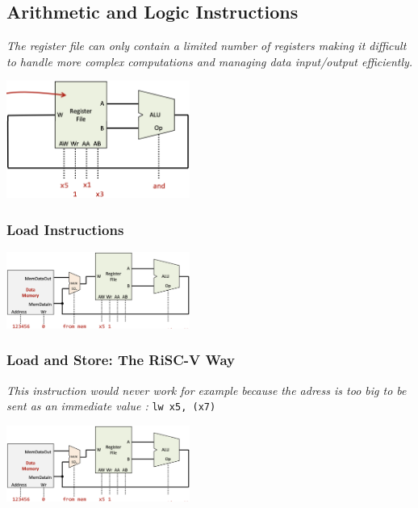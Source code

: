 \subsection{Arithmetic and Logic Instructions}
\textit{The register file can only contain a limited number of registers making it difficult to handle more complex computations and managing data input/output efficiently.}
\begin{center}
    \includegraphics[width=0.45\textwidth]{chapters/chapter1c/images/arith_logic.png}
\end{center}
\subsubsection{Load Instructions}
\begin{center}
    \includegraphics[width=0.45\textwidth]{chapters/chapter1c/images/load.png}
\end{center}
\subsubsection{Load and Store: The RiSC-V Way}
\textit{This instruction would never work for example because the adress is too big to be sent as an immediate value :} \texttt{lw x5, (x7)} \\ \vspace*{5px}
\begin{center}
    \includegraphics[width=0.45\textwidth]{chapters/chapter1c/images/load.png}
\end{center}
